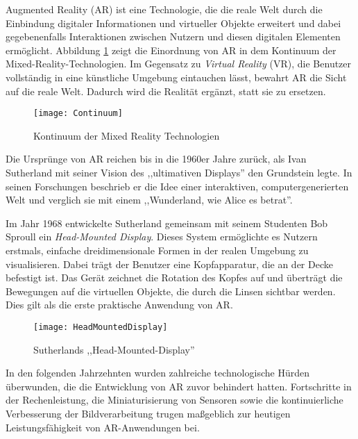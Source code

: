 Augmented Reality (AR) ist eine Technologie, die die reale Welt durch die Einbindung digitaler Informationen und virtueller Objekte erweitert und dabei gegebenenfalls Interaktionen zwischen Nutzern und diesen digitalen Elementen ermöglicht. Abbildung \ref{fig:Continuum} zeigt die Einordnung von AR in dem Kontinuum der Mixed-Reality-Technologien. Im Gegensatz zu \emph{Virtual Reality} (VR), die Benutzer vollständig in eine künstliche Umgebung eintauchen lässt, bewahrt AR die Sicht auf die reale Welt. Dadurch wird die Realität ergänzt, statt sie zu ersetzen. \cite{azuma1997ar, doerner2022virtual}

\begin{figure}
    \centering
    \texttt{[image: Continuum]}
    \caption{Kontinuum der Mixed Reality Technologien\label{fig:Continuum}}\par
\end{figure}

Die Ursprünge von AR reichen bis in die 1960er Jahre zurück, als Ivan Sutherland mit seiner Vision des ,,ultimativen Displays'' \cite{sutherland1965ultimateDisplay} den Grundstein legte. In seinen Forschungen beschrieb er die Idee einer interaktiven, computergenerierten Welt und verglich sie mit einem ,,Wunderland, wie Alice es betrat''. 

Im Jahr 1968 entwickelte Sutherland gemeinsam mit seinem Studenten Bob Sproull ein \textit{Head-Mounted Display}. Dieses System ermöglichte es Nutzern erstmals, einfache dreidimensionale Formen in der realen Umgebung zu visualisieren. Dabei trägt der Benutzer eine Kopfapparatur, die an der Decke befestigt ist. Das Gerät zeichnet die Rotation des Kopfes auf und überträgt die Bewegungen auf die virtuellen Objekte, die durch die Linsen sichtbar werden. Dies gilt als die erste praktische Anwendung von AR. \cite{sutherland19683dDisplay, doerner2022virtual}

\begin{figure}
    \centering
    \texttt{[image: HeadMountedDisplay]}
    \caption{Sutherlands ,,Head-Mounted-Display'' \cite{sutherland1965ultimateDisplay}\label{fig:HeadMountedDisplay}}\par
\end{figure}

In den folgenden Jahrzehnten wurden zahlreiche technologische Hürden überwunden, die die Entwicklung von AR zuvor behindert hatten. Fortschritte in der Rechenleistung, die Miniaturisierung von Sensoren sowie die kontinuierliche Verbesserung der Bildverarbeitung trugen maßgeblich zur heutigen Leistungsfähigkeit von AR-Anwendungen bei. \cite{doerner2022virtual}

